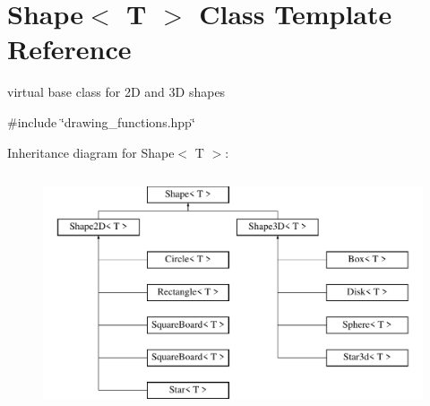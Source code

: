 \hypertarget{classShape}{}\section{Shape$<$ T $>$ Class Template Reference}
\label{classShape}


virtual base class for 2D and 3D shapes  




{\ttfamily \#include \char`\"{}drawing\+\_\+functions.\+hpp\char`\"{}}

Inheritance diagram for Shape$<$ T $>$\+:\begin{figure}[H]
\begin{center}
\leavevmode
\includegraphics[height=7.000000cm]{classShape}
\end{center}
\end{figure}
